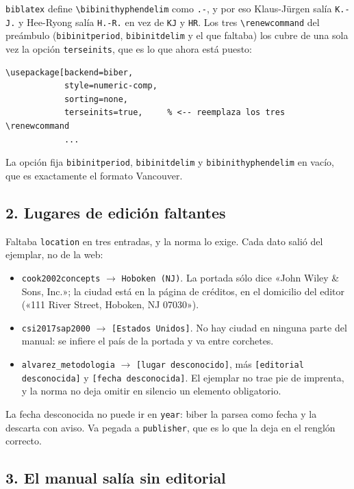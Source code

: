 \documentclass[11pt,a4paper]{article}
\newcommand{\anot}[1]{{\color{gris}\footnotesize #1}}
\begin{document}
\texttt{biblatex} define \texttt{\textbackslash bibinithyphendelim} como \texttt{.-}, y por eso
Klaus-Jürgen salía \texttt{K.-J.} y Hee-Ryong salía \texttt{H.-R.} en vez de \texttt{KJ} y
\texttt{HR}. Los tres \texttt{\textbackslash renewcommand} del preámbulo
(\texttt{bibinitperiod}, \texttt{bibinitdelim} y el que faltaba) los cubre de una sola vez la
opción \texttt{terseinits}, que es lo que ahora está puesto:

\begin{Verbatim}[fontsize=\small,xleftmargin=4pt]
\usepackage[backend=biber,
            style=numeric-comp,
            sorting=none,
            terseinits=true,     % <-- reemplaza los tres \renewcommand
            ...
\end{Verbatim}
\anot{La opción fija \texttt{bibinitperiod}, \texttt{bibinitdelim} y
\texttt{bibinithyphendelim} en vacío, que es exactamente el formato Vancouver.}

\subsection*{2. Lugares de edición faltantes}

Faltaba \texttt{location} en tres entradas, y la norma lo exige. Cada dato salió del ejemplar,
no de la web:

\begin{itemize}\setlength{\itemsep}{3pt}
\item \texttt{cook2002concepts} $\rightarrow$ \texttt{Hoboken (NJ)}. La portada sólo dice
  «John Wiley \& Sons, Inc.»; la ciudad está en la página de créditos, en el domicilio del
  editor («111 River Street, Hoboken, NJ 07030»).
\item \texttt{csi2017sap2000} $\rightarrow$ \texttt{[Estados Unidos]}. No hay ciudad en
  ninguna parte del manual: se infiere el país de la portada y va entre corchetes.
\item \texttt{alvarez\_metodologia} $\rightarrow$ \texttt{[lugar desconocido]}, más
  \texttt{[editorial desconocida]} y \texttt{[fecha desconocida]}. El ejemplar no trae pie de
  imprenta, y la norma no deja omitir en silencio un elemento obligatorio.
\end{itemize}

\anot{La fecha desconocida no puede ir en \texttt{year}: biber la parsea como fecha y la
descarta con aviso. Va pegada a \texttt{publisher}, que es lo que la deja en el renglón
correcto.}

\subsection*{3. El manual salía sin editorial}
\end{document}

